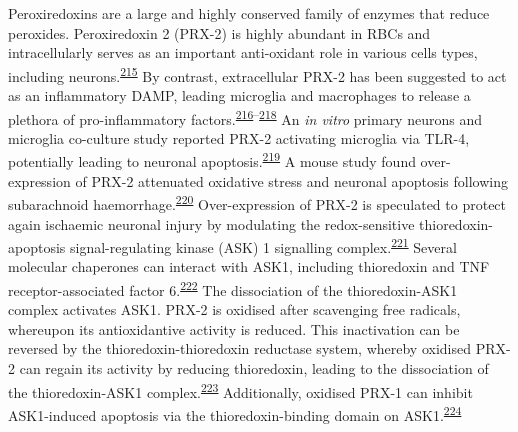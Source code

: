 \documentclass[
]{article}
\begin{document}
Peroxiredoxins are a large and highly conserved family of enzymes that reduce peroxides.
Peroxiredoxin 2 (PRX-2) is highly abundant in RBCs and intracellularly serves as an important anti-oxidant role in various cells types, including neurons.\textsuperscript{\protect\hyperlink{ref-low_peroxiredoxin_2008}{215}}
By contrast, extracellular PRX-2 has been suggested to act as an inflammatory DAMP, leading microglia and macrophages to release a plethora of pro-inflammatory factors.\textsuperscript{\protect\hyperlink{ref-salzano_linkage_2014}{216}--\protect\hyperlink{ref-shichita_peroxiredoxin_2012}{218}}
An \emph{in vitro} primary neurons and microglia co-culture study reported PRX-2 activating microglia via TLR-4, potentially leading to neuronal apoptosis.\textsuperscript{\protect\hyperlink{ref-lu_peroxiredoxin_2018}{219}}
A mouse study found over-expression of PRX-2 attenuated oxidative stress and neuronal apoptosis following subarachnoid haemorrhage.\textsuperscript{\protect\hyperlink{ref-lu_peroxiredoxin_2019}{220}}
Over-expression of PRX-2 is speculated to protect again ischaemic neuronal injury by modulating the redox-sensitive thioredoxin-apoptosis signal-regulating kinase (ASK) 1 signalling complex.\textsuperscript{\protect\hyperlink{ref-gan_transgenic_2012}{221}}
Several molecular chaperones can interact with ASK1, including thioredoxin and TNF receptor-associated factor 6.\textsuperscript{\protect\hyperlink{ref-matsuzawa_ros-dependent_2005}{222}}
The dissociation of the thioredoxin-ASK1 complex activates ASK1.
PRX-2 is oxidised after scavenging free radicals, whereupon its antioxidantive activity is reduced.
This inactivation can be reversed by the thioredoxin-thioredoxin reductase system, whereby oxidised PRX-2 can regain its activity by reducing thioredoxin, leading to the dissociation of the thioredoxin-ASK1 complex.\textsuperscript{\protect\hyperlink{ref-rhee_multiple_2011}{223}}
Additionally, oxidised PRX-1 can inhibit ASK1-induced apoptosis via the thioredoxin-binding domain on ASK1.\textsuperscript{\protect\hyperlink{ref-kim_novel_2008}{224}}
\end{document}
